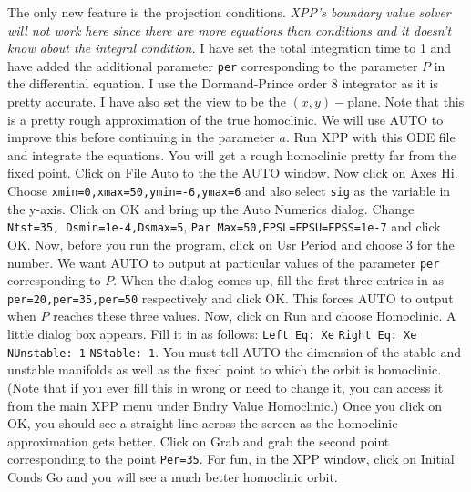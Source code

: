 \documentclass{article}
\begin{document}
The only new feature is the projection conditions. {\em XPP's boundary
value solver will not work here since there are more equations than
conditions and it doesn't know about the integral condition.} I have
set the total integration time to 1 and have added the additional
parameter {\tt per} corresponding to the parameter $P$ in the
differential equation.  I use the Dormand-Prince order 8 integrator as
it is pretty accurate.  I have also set the view to be the
$(x,y)-$plane. Note that this is a pretty rough approximation
of the true homoclinic. We will use AUTO to improve this before
continuing in the parameter $a$.  Run XPP with this ODE file and
integrate the equations. You will get a rough homoclinic pretty far
from the fixed point. Click on File Auto to the the AUTO window. Now
click on Axes Hi. Choose {\tt xmin=0,xmax=50,ymin=-6,ymax=6} and also
select {\tt sig} as the variable in the y-axis.  Click on OK and bring
up the Auto Numerics dialog.  Change {\tt Ntst=35, Dsmin=1e-4,Dsmax=5}, 
{\tt Par Max=50,EPSL=EPSU=EPSS=1e-7} and click OK. Now, before you run
the program, click on Usr Period and choose 3 for the number.  We want
AUTO to output at particular values of the parameter {\tt per}
corresponding to $P$. When the dialog comes up, fill the first three
entries in as {\tt per=20,per=35,per=50} respectively and click
OK. This forces AUTO to output when $P$ reaches these three values.
Now, click on Run and choose Homoclinic. A little dialog box
appears. Fill it in as follows: {\tt Left Eq: Xe}  {\tt Right Eq: Xe}  
 {\tt NUnstable: 1}   {\tt NStable: 1}.  You must tell AUTO the
dimension of the stable and unstable manifolds as well as the fixed
point to which the orbit is homoclinic. (Note that if you ever fill this in
wrong or need to change it, you can access it from the main XPP menu
under Bndry Value Homoclinic.)   Once you click on OK, you should see
a straight line across the screen as the homoclinic approximation gets
better. Click on Grab and grab the second point corresponding to the
point {\tt Per=35}.  For fun, in the XPP window, click on Initial
Conds Go and you will see a much better homoclinic orbit. 
\end{document}
